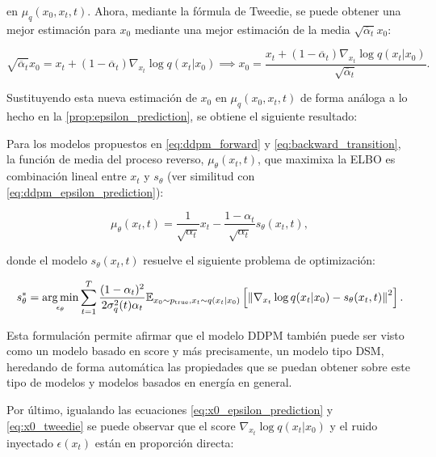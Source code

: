 en $\mu_q(x_0,x_t,t)$. Ahora, mediante la fórmula de Tweedie, se puede obtener una mejor estimación para $x_0$ mediante una mejor estimación de la media $\sqrt{\overline{\alpha}_t}x_0$:

\begin{equation}
    \label{eq:x0_tweedie}
    \sqrt{\overline{\alpha}_t}x_0 = x_t+(1-\overline{\alpha}_t)\nabla_{x_t}\log q(x_t|x_0) \implies x_0 = \frac{x_t+(1-\overline{\alpha}_t)\nabla_{x_t}\log q(x_t|x_0)}{\sqrt{\overline{\alpha}_t}} .
\end{equation}

Sustituyendo esta nueva estimación de $x_0$ en $\mu_q(x_0,x_t,t)$ de forma análoga a lo hecho en la \autoref{prop:epsilon_prediction}, se obtiene el siguiente resultado:

\begin{prop}
    \label{prop:score_prediction}
    Para los modelos propuestos en \eqref{eq:ddpm_forward} y \eqref{eq:backward_transition}, la función de media del proceso reverso, $\mu_\theta(x_t,t)$, que maximixa la ELBO es combinación lineal entre $x_t$ y $s_\theta$ (ver similitud con \eqref{eq:ddpm_epsilon_prediction}):

    \begin{equation*}
        \mu_\theta(x_t,t) = \frac{1}{\sqrt{\alpha_t}}x_t - \frac{1-\alpha_t}{\sqrt{\alpha_t}}s_\theta(x_t,t) ,
    \end{equation*}

    donde el modelo $s_\theta(x_t,t)$ resuelve el siguiente problema de optimización:

    \begin{equation*}
        s_\theta^*=\operatorname*{arg\,min}_{\epsilon_\theta} \sum_{t=1}^T \frac{(1-\alpha_t)^2}{2\sigma_q^2(t)\alpha_t} \mathbb{E}_{x_0\sim p_{\operatorname{true}}, x_t\sim q(x_t|x_0)}\left[\left\lVert \nabla_{x_t}\log q(x_t|x_0) - s_\theta(x_t,t) \right\rVert^2\right] .
    \end{equation*}
\end{prop}

Esta formulación permite afirmar que el modelo DDPM también puede ser visto como un modelo basado en score y más precisamente, un modelo tipo DSM, heredando de forma automática las propiedades que se puedan obtener sobre este tipo de modelos y modelos basados en energía en general.

Por último, igualando las ecuaciones \eqref{eq:x0_epsilon_prediction} y \eqref{eq:x0_tweedie} se puede observar que el score $\nabla_{x_t}\log q(x_t|x_0)$ y el ruido inyectado $\epsilon(x_t)$ están en proporción directa:

